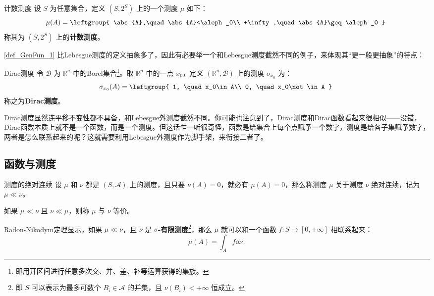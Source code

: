 \begin{example}{计数测度}
设 $S$ 为任意集合，定义 $(S, 2^S)$ 上的一个测度 $\mu$ 如下：
\begin{equation}
\mu(A)=
\leftgroup{
    \abs{A},\quad \abs{A}<\aleph_0\\
    +\infty,\quad \abs{A}\geq\aleph_0
}~
\end{equation}
称其为 $(S, 2^S)$ 上的\textbf{计数测度}。
\end{example}

\autoref{def_GenFun_1} 比Lebesgue测度的定义抽象多了，因此有必要举一个和Lebesgue测度截然不同的例子，来体现其“更一般更抽象”的特点：

\begin{example}{Dirac测度}
令 $\mathcal{B}$ 为 $\mathbb{R}^n$ 中的Borel集合\footnote{即用开区间进行任意多次交、并、差、补等运算获得的集族。}。取 $\mathbb{R}^n$ 中的一点 $x_0$，定义 $(\mathbb{R}^n, \mathcal{B})$ 上的测度 $\sigma_{x_0}$ 为：
\begin{equation}
\sigma_{x_0}(A)=\leftgroup{
    1, \quad x_0\in A\\
    0, \quad x_0\not\in A
}~
\end{equation}
称之为\textbf{Dirac测度}。
\end{example}

Dirac测度显然连平移不变性都不具备，和Lebesgue外测度截然不同。你可能也注意到了，Dirac测度和Dirac函数看起来很相似——没错，Dirac函数本质上就不是一个函数，而是一个测度。但这话乍一听很奇怪，函数是给集合上每个点赋予一个数字，测度是给各子集赋予数字，两者是怎么联系起来的呢？这就需要利用Lebesgue外测度作为脚手架，来衔接二者了。





\subsection{函数与测度}




\begin{definition}{测度的绝对连续}
设 $\mu$ 和 $\nu$ 都是 $(S, \mathcal{A})$ 上的测度，且只要 $\nu(A)=0$，就必有 $\mu(A)=0$，那么称测度 $\mu$ 关于测度 $\nu$ 绝对连续，记为 $\mu\ll\nu$。

如果 $\mu\ll\nu$ 且 $\nu\ll\mu$，则称 $\mu$ 与 $\nu$ 等价。
\end{definition}



Radon-Nikodym定理显示，如果 $\mu\ll\nu$，且 $\nu$ 是 $\sigma$\textbf{-有限测度}\footnote{即 $S$ 可以表示为最多可数个 $B_i\in\mathcal{A}$ 的并集，且 $\nu(B_i)<+\infty$ 恒成立。}，那么 $\mu$ 就可以和一个函数 $f:S\to [0, +\infty]$ 相联系起来：
\begin{equation}
\mu(A) = \int_A f \dd \nu~.
\end{equation}

